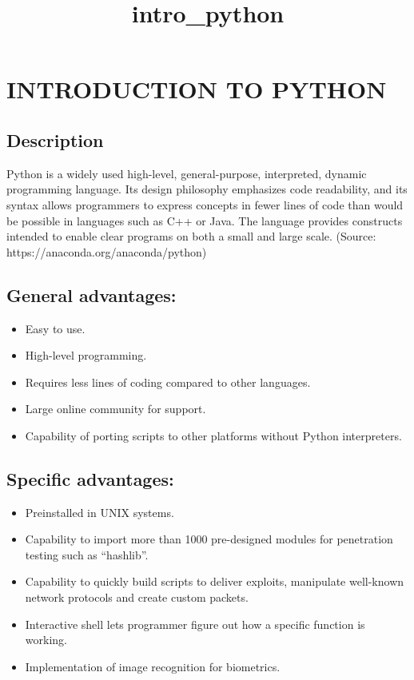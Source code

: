 \documentclass[11pt]{article}
\title{intro\_python}
\providecommand{\tightlist}{%
      \setlength{\itemsep}{0pt}\setlength{\parskip}{0pt}}
\begin{document}
    
    
    \maketitle
    
    

    
    \section{INTRODUCTION TO PYTHON}\label{introduction-to-python}

    \subsection{Description}\label{description}

Python is a widely used high-level, general-purpose, interpreted,
dynamic programming language. Its design philosophy emphasizes code
readability, and its syntax allows programmers to express concepts in
fewer lines of code than would be possible in languages such as C++ or
Java. The language provides constructs intended to enable clear programs
on both a small and large scale. (Source:
https://anaconda.org/anaconda/python)

    \subsection{General advantages:}\label{general-advantages}

\begin{itemize}
\tightlist
\item
  Easy to use.
\item
  High-level programming.
\item
  Requires less lines of coding compared to other languages.
\item
  Large online community for support.
\item
  Capability of porting scripts to other platforms without Python
  interpreters.
\end{itemize}

    \subsection{Specific advantages:}\label{specific-advantages}

\begin{itemize}
\tightlist
\item
  Preinstalled in UNIX systems.
\item
  Capability to import more than 1000 pre-designed modules for
  penetration testing such as ``hashlib''.
\item
  Capability to quickly build scripts to deliver exploits, manipulate
  well-known network protocols and create custom packets.
\item
  Interactive shell lets programmer figure out how a specific function
  is working.
\item
  Implementation of image recognition for biometrics.
\end{itemize}
\end{document}
